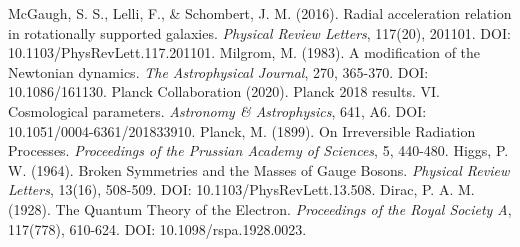 \documentclass[12pt,a4paper]{article}
\begin{document}
\begin{thebibliography}{99}
		 McGaugh, S. S., Lelli, F., \& Schombert, J. M. (2016). Radial acceleration relation in rotationally supported galaxies. \textit{Physical Review Letters}, 117(20), 201101. DOI: 10.1103/PhysRevLett.117.201101.
		 Milgrom, M. (1983). A modification of the Newtonian dynamics. \textit{The Astrophysical Journal}, 270, 365-370. DOI: 10.1086/161130.
		 Planck Collaboration (2020). Planck 2018 results. VI. Cosmological parameters. \textit{Astronomy \& Astrophysics}, 641, A6. DOI: 10.1051/0004-6361/201833910.
		 Planck, M. (1899). On Irreversible Radiation Processes. \textit{Proceedings of the Prussian Academy of Sciences}, 5, 440-480.
		 Higgs, P. W. (1964). Broken Symmetries and the Masses of Gauge Bosons. \textit{Physical Review Letters}, 13(16), 508-509. DOI: 10.1103/PhysRevLett.13.508.
		 Dirac, P. A. M. (1928). The Quantum Theory of the Electron. \textit{Proceedings of the Royal Society A}, 117(778), 610-624. DOI: 10.1098/rspa.1928.0023.
	\end{thebibliography}
	
\end{document}
